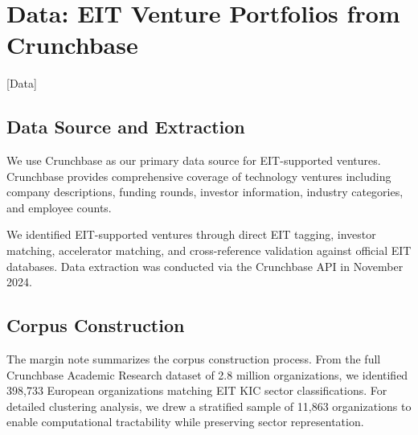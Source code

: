 \documentclass[../main.tex]{subfiles}
\begin{document}
\section{Data: EIT Venture Portfolios from Crunchbase}[Data]

\subsection{Data Source and Extraction}

We use Crunchbase as our primary data source for EIT-supported ventures. Crunchbase provides comprehensive coverage of technology ventures including company descriptions, funding rounds, investor information, industry categories, and employee counts.

We identified EIT-supported ventures through direct EIT tagging, investor matching, accelerator matching, and cross-reference validation against official EIT databases. Data extraction was conducted via the Crunchbase API in November 2024.

\subsection{Corpus Construction}


The margin note summarizes the corpus construction process. From the full Crunchbase Academic Research dataset of 2.8 million organizations, we identified 398,733 European organizations matching EIT KIC sector classifications. For detailed clustering analysis, we drew a stratified sample of 11,863 organizations to enable computational tractability while preserving sector representation.
\end{document}
